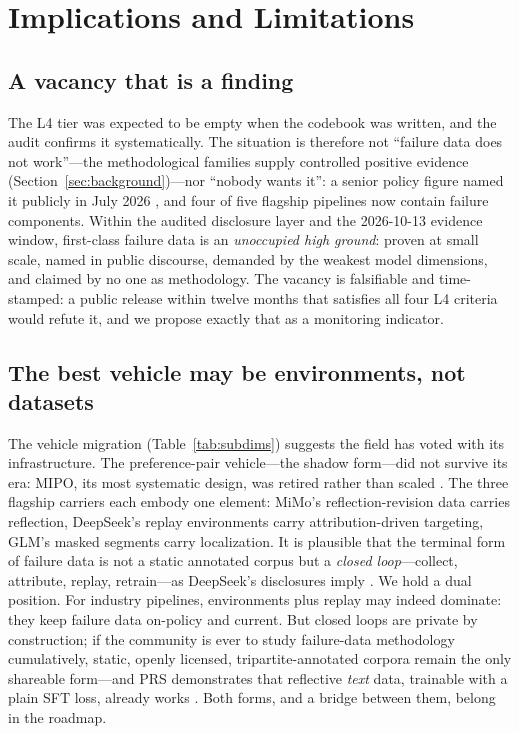 \documentclass[10pt]{article}
\begin{document}
\section{Implications and Limitations}\label{sec:discussion}

\subsection{A vacancy that is a finding}

The L4 tier was expected to be empty when the codebook was written, and the audit confirms it systematically. The situation is therefore not ``failure data does not work''---the methodological families supply controlled positive evidence (Section~\ref{sec:background})---nor ``nobody wants it'': a senior policy figure named it publicly in July 2026 \cite{waic2026}, and four of five flagship pipelines now contain failure components. Within the audited disclosure layer and the 2026-10-13 evidence window, first-class failure data is an \emph{unoccupied high ground}: proven at small scale, named in public discourse, demanded by the weakest model dimensions, and claimed by no one as methodology. The vacancy is falsifiable and time-stamped: a public release within twelve months that satisfies all four L4 criteria would refute it, and we propose exactly that as a monitoring indicator.

\subsection{The best vehicle may be environments, not datasets}

The vehicle migration (Table~\ref{tab:subdims}) suggests the field has voted with its infrastructure. The preference-pair vehicle---the shadow form---did not survive its era: MIPO, its most systematic design, was retired rather than scaled \cite{zai2025glm45}. The three flagship carriers each embody one element: MiMo's reflection-revision data carries reflection, DeepSeek's replay environments carry attribution-driven targeting, GLM's masked segments carry localization. It is plausible that the terminal form of failure data is not a static annotated corpus but a \emph{closed loop}---collect, attribute, replay, retrain---as DeepSeek's disclosures imply \cite{deepseek2026v41}. We hold a dual position. For industry pipelines, environments plus replay may indeed dominate: they keep failure data on-policy and current. But closed loops are private by construction; if the community is ever to study failure-data methodology cumulatively, static, openly licensed, tripartite-annotated corpora remain the only shareable form---and PRS demonstrates that reflective \emph{text} data, trainable with a plain SFT loss, already works \cite{hao2026prs}. Both forms, and a bridge between them, belong in the roadmap.
\end{document}
